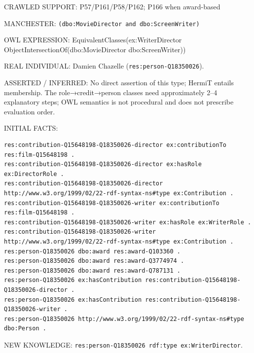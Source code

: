 \documentclass[
  11pt,
]{article}
\begin{document}
CRAWLED SUPPORT:
P57/\allowbreak{}\allowbreak{}P161\allowbreak{}/\allowbreak{}\allowbreak{}P58/\allowbreak{}\allowbreak{}P16\allowbreak{}2;
P166 when award-based

MANCHESTER:
\texttt{(dbo:\allowbreak{}\allowbreak{}Mov\allowbreak{}ie\allowbreak{}Direct\allowbreak{}or and d\allowbreak{}bo:\allowbreak{}\allowbreak{}Scree\allowbreak{}n\allowbreak{}Writer)\allowbreak{}}

OWL EXPRESSION:
Equivale\allowbreak{}nt\allowbreak{}Classe\allowbreak{}s(ex:\allowbreak{}\allowbreak{}Wri\allowbreak{}ter\allowbreak{}Direc\allowbreak{}tor
Object\allowbreak{}In\allowbreak{}tersecti\allowbreak{}on\allowbreak{}Of(dbo\allowbreak{}:\allowbreak{}\allowbreak{}Movie\allowbreak{}Di\allowbreak{}rector
dbo:\allowbreak{}\allowbreak{}Scre\allowbreak{}en\allowbreak{}Writer\allowbreak{}))

REAL INDIVIDUAL: Damien Chazelle
(\texttt{res:\allowbreak{}pers\allowbreak{}on-\allowbreak{}\allowbreak{}Q1835\allowbreak{}0026}).

ASSERTED / INFERRED: No direct assertion of this type; HermiT entails
membership. The role→credit→person classes need
approxim\allowbreak{}ately 2--4 explanatory steps; OWL semantics is not
procedural and does not prescribe evaluation order.

INITIAL FACTS:

\begin{verbatim}
res:contribution-Q15648198-Q18350026-director ex:contributionTo res:film-Q15648198 .
res:contribution-Q15648198-Q18350026-director ex:hasRole ex:DirectorRole .
res:contribution-Q15648198-Q18350026-director http://www.w3.org/1999/02/22-rdf-syntax-ns#type ex:Contribution .
res:contribution-Q15648198-Q18350026-writer ex:contributionTo res:film-Q15648198 .
res:contribution-Q15648198-Q18350026-writer ex:hasRole ex:WriterRole .
res:contribution-Q15648198-Q18350026-writer http://www.w3.org/1999/02/22-rdf-syntax-ns#type ex:Contribution .
res:person-Q18350026 dbo:award res:award-Q103360 .
res:person-Q18350026 dbo:award res:award-Q3774974 .
res:person-Q18350026 dbo:award res:award-Q787131 .
res:person-Q18350026 ex:hasContribution res:contribution-Q15648198-Q18350026-director .
res:person-Q18350026 ex:hasContribution res:contribution-Q15648198-Q18350026-writer .
res:person-Q18350026 http://www.w3.org/1999/02/22-rdf-syntax-ns#type dbo:Person .
\end{verbatim}

NEW KNOWLEDGE:
\texttt{res:\allowbreak{}pers\allowbreak{}on-\allowbreak{}\allowbreak{}Q1835\allowbreak{}0026 rdf\allowbreak{}:\allowbreak{}type ex\allowbreak{}:\allowbreak{}\allowbreak{}Writer\allowbreak{}D\allowbreak{}irector}.
\end{document}
